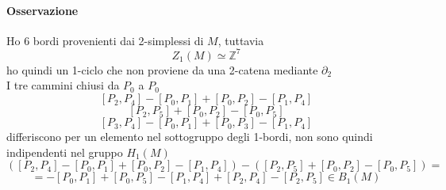 \documentclass[a4paper]{report}
\newcommand{\Z}{\ensuremath{\mathbb{Z}}}
\begin{document}
\paragraph{Osservazione} Ho 6 bordi provenienti dai 2-simplessi di $M$, tuttavia
\[
    Z_1(M)\simeq\Z^7
\]
ho quindi un 1-ciclo che non proviene da una 2-catena mediante $\partial_2$\\
I tre cammini chiusi da $P_0$ a $P_0$
\[
    [P_2,P_4]-[P_0,P_1]+[P_0,P_2]-[P_1,P_4]
\]
\[
    [P_2,P_5]+[P_0,P_2]-[P_0,P_5]
\]
\[
    [P_3,P_4]-[P_0,P_1]+[P_0,P_3]-[P_1,P_4]
\]
differiscono per un elemento nel sottogruppo degli 1-bordi, non sono quindi indipendenti nel gruppo $H_1(M)$
\[
    ([P_2,P_4]-[P_0,P_1]+[P_0,P_2]-[P_1,P_4])-([P_2,P_5]+[P_0,P_2]-[P_0,P_5])=
\]
\[
    =-[P_0,P_1]+[P_0,P_5]-[P_1,P_4]+[P_2,P_4]-[P_2,P_5]\in B_1(M)
\]
\begin{center}



    \begin{tikzpicture}[x=0.75pt,y=0.75pt,yscale=-1,xscale=1]


\end{tikzpicture}
\end{center}
\end{document}
